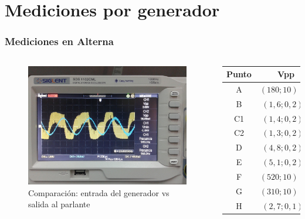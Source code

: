 \section{Mediciones por generador}
\begin{frame}
	\frametitle{Mediciones en Alterna}
	\begin{columns}[t]
		\begin{figure}
			\centering
			\includegraphics[scale=0.05]{20141201_152841}
           \caption{Comparación: entrada del generador vs salida al parlante}
		\end{figure}
		\begin{table}
			\centering
			\begin{tabular}{c|c}
				Punto & Vpp \\
				\hline \hline
				A & $(180;10)\>mV$   \\
				\hline
				B & $(1,6;0,2)\>V$ \\
				\hline
				C1 & $(1,4;0,2)\>V$ \\
				\hline
				C2 & $(1,3;0,2)\>V$ \\
				\hline
				D & $(4,8;0,2)\>V$  \\
				\hline
				E & $(5,1;0,2)\>V$ \\
				\hline
				F & $(520;10)\>mV$ \\
				\hline
				G & $(310;10)\>mV$ \\
				\hline
				H & $(2,7;0,1)\>V$ \\
				\hline
				\end{tabular}
		\end{table}
	\end{columns}
\end{frame}